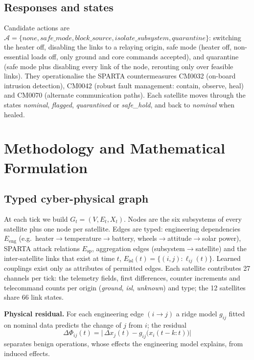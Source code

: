 \documentclass[conference]{IEEEtran}
\begin{document}
\subsection{Responses and states}
Candidate actions are $\mathcal{A}=\{\textit{none}, \textit{safe\_mode}, \textit{block\_source},
\textit{isolate\_subsystem}, \textit{quarantine}\}$: switching the heater off, disabling the links to a
relaying origin, safe mode (heater off, non-essential loads off, only ground and core commands
accepted), and quarantine (safe mode plus disabling every link of the node, rerouting only over
feasible links). They operationalise the SPARTA countermeasures CM0032 (on-board intrusion detection),
CM0042 (robust fault management: contain, observe, heal) and CM0070 (alternate communication paths).
Each satellite moves through the states \emph{nominal}, \emph{flagged}, \emph{quarantined} or
\emph{safe\_hold}, and back to \emph{nominal} when healed.

\section{Methodology and Mathematical Formulation}
\label{sec:method}

\subsection{Typed cyber-physical graph}
At each tick we build $G_t=(V,E_t,X_t)$. Nodes are the six subsystems of every satellite plus one node
per satellite. Edges are typed: engineering dependencies $E_{\mathrm{eng}}$ (e.g.\
heater$\rightarrow$temperature$\rightarrow$battery, wheels$\rightarrow$attitude$\rightarrow$solar
power), SPARTA attack relations $E_{\mathrm{sp}}$, aggregation edges (subsystem$\rightarrow$satellite)
and the inter-satellite links that exist at time $t$, $E_{\mathrm{isl}}(t)=\{(i,j):\ell_{ij}(t)\}$.
Learned couplings exist only as attributes of permitted edges. Each satellite contributes 27 channels
per tick: the telemetry fields, first differences, counter increments and telecommand counts per origin
(\textit{ground}, \textit{isl}, \textit{unknown}) and type; the 12 satellites share 66 link states.

\textbf{Physical residual.} For each engineering edge $(i\!\rightarrow\! j)$ a ridge model $g_{ij}$
fitted on nominal data predicts the change of $j$ from $i$; the residual
\begin{equation}
\Delta\Phi_{ij}(t) = \big|\,\Delta x_j(t) - g_{ij}\big(x_i(t-k{:}t)\big)\big|
\label{eq:residual}
\end{equation}
separates benign operations, whose effects the engineering model explains, from induced effects.
\end{document}
